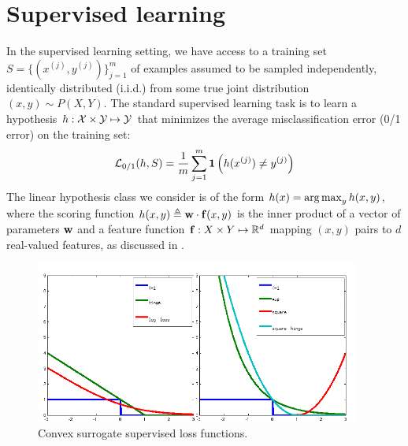 \section{Supervised learning}\label{sec:learning}
In the supervised learning setting, we have access to a training set
$S = \{(x^{(j)},y^{(j)})\}_{j=1}^m$ of examples assumed to be sampled 
independently, identically distributed (i.i.d.) from some true joint 
distribution $(x,y) \sim P(X,Y)$. The standard supervised learning task is to 
learn a hypothesis $h: \mathcal{X} \times \mathcal{Y} \mapsto \mathcal{Y}$ that minimizes the average misclassification error (0/1 error) on the training set: 
\begin{align}
\mathcal{L}_{0/1}(h,S) = \frac{1}{m}\sum_{j=1}^m \mathbf{1}\left(h(x^{(j)}) \neq y^{(j)}\right)
\end{align}
The linear hypothesis class we consider is of the form $h(x) = \mathop{\arg\max}_y h(x,y)$, where the
scoring function $h(x,y) \triangleq \mathbf{w} \cdot \mathbf{f}(x,y)$ is the
inner product of a vector of parameters $\mathbf{w}$ and a feature
function $\mathbf{f}: X \times Y \mapsto \mathbb{R}^d$ mapping $(x,y)$ pairs to
$d$ real-valued features, as discussed in .  

\begin{figure}[tb]
\begin{center}
\includegraphics[width=0.95\textwidth]{figs/losses.png}
\caption[Convex surrogate supervised loss functions.]{Convex surrogate supervised loss functions.}
\label{fig:surrogates}
\end{center}
\end{figure}

